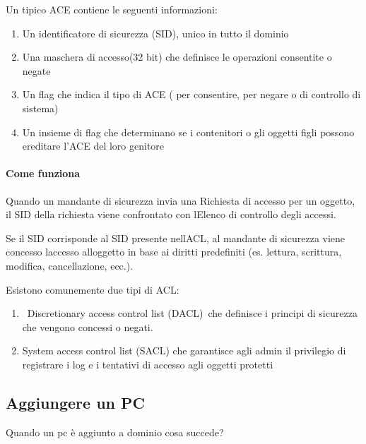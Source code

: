 \documentclass[
]{article}
\providecommand{\tightlist}{%
  \setlength{\itemsep}{0pt}\setlength{\parskip}{0pt}}
\begin{document}
{}

{Un tipico ACE contiene le seguenti informazioni: }

\begin{enumerate}
\tightlist
\item
  {Un identificatore di sicurezza (SID), unico in tutto il dominio }
\item
  {Una maschera di accesso(32 bit) che definisce le operazioni
  consentite o negate }
\item
  {Un flag che indica il tipo di ACE ( per consentire, per negare o di
  controllo di sistema) }
\item
  {Un insieme di flag che determinano se i contenitori o gli oggetti
  figli possono ereditare l'ACE del loro genitore }
\end{enumerate}

\paragraph{\texorpdfstring{{Come
funziona}}{Come funziona}}\label{h.k8i73ag2mgjo}

{Quando un mandante di sicurezza invia una Richiesta di accesso per un
oggetto, il SID della richiesta viene confrontato con
l\textquotesingle Elenco di controllo degli accessi. }

{Se il SID corrisponde al SID presente nell\textquotesingle ACL, al
mandante di sicurezza viene concesso l\textquotesingle accesso
all\textquotesingle oggetto in base ai diritti predefiniti (es. lettura,
scrittura, modifica, cancellazione, ecc.). }

{Esistono comunemente due tipi di ACL:}

\begin{enumerate}
\tightlist
\item
  {~Discretionary access control list }{(DACL)}{~che definisce i
  principi di sicurezza che vengono concessi o negati. }
\item
  {System access control list (SACL) che garantisce agli admin il
  privilegio di registrare i log e i tentativi di accesso agli oggetti
  protetti}
\end{enumerate}

\subsection{\texorpdfstring{{Aggiungere un
PC}}{Aggiungere un PC}}\label{h.esbzs95cto1y}

{Quando un pc è aggiunto a dominio cosa succede?}
\end{document}
